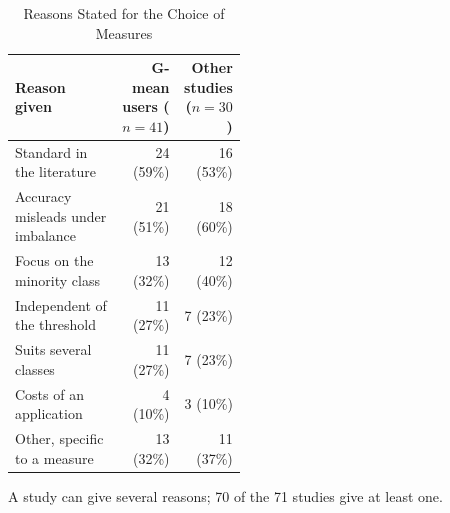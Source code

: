 \begin{table}[t]
  \caption{Reasons Stated for the Choice of Measures}
  \label{tab:empirical-gmean-reasons}
  \footnotesize
  \setlength{\tabcolsep}{4pt}
  \begin{tabular}{@{}>{\raggedright\arraybackslash}p{0.46\linewidth}rr@{}}
    \toprule
    Reason given & G-mean users ($n = 41$) & Other studies ($n = 30$)\\
    \midrule
    Standard in the literature & 24 (59\%) & 16 (53\%)\\
    Accuracy misleads under imbalance & 21 (51\%) & 18 (60\%)\\
    Focus on the minority class & 13 (32\%) & 12 (40\%)\\
    Independent of the threshold & 11 (27\%) & 7 (23\%)\\
    Suits several classes & 11 (27\%) & 7 (23\%)\\
    Costs of an application & 4 (10\%) & 3 (10\%)\\
    Other, specific to a measure & 13 (32\%) & 11 (37\%)\\
    \bottomrule
  \end{tabular}
  \par\smallskip\raggedright\scriptsize A study can give several reasons; 70 of the 71 studies give at least one.
\end{table}
